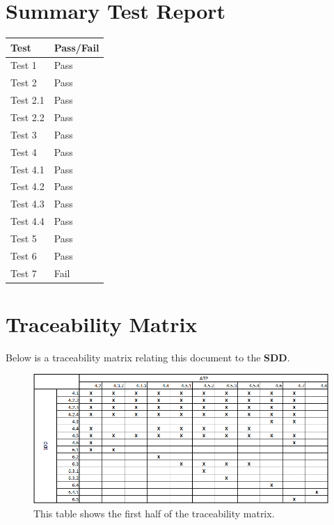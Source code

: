 \documentclass[11pt]{article}
\begin{document}
\section{Summary Test Report}
\begin{table}[h]
\begin{tabular}{ll}
\textbf{Test}     & \textbf{Pass/Fail} \\ \hline
\multicolumn{1}{|L{10cm}|}{Test 1} & \multicolumn{1}{L{2cm}|}{Pass} \\ \hline
\multicolumn{1}{|L{10cm}|}{Test 2} & \multicolumn{1}{L{2cm}|}{Pass} \\ \hline
\multicolumn{1}{|L{10cm}|}{Test 2.1} & \multicolumn{1}{L{2cm}|}{Pass} \\ \hline
\multicolumn{1}{|L{10cm}|}{Test 2.2} & \multicolumn{1}{L{2cm}|}{Pass} \\ \hline
\multicolumn{1}{|L{10cm}|}{Test 3} & \multicolumn{1}{L{2cm}|}{Pass} \\ \hline
\multicolumn{1}{|L{10cm}|}{Test 4} & \multicolumn{1}{L{2cm}|}{Pass} \\ \hline
\multicolumn{1}{|L{10cm}|}{Test 4.1} & \multicolumn{1}{L{2cm}|}{Pass} \\ \hline
\multicolumn{1}{|L{10cm}|}{Test 4.2} & \multicolumn{1}{L{2cm}|}{Pass} \\ \hline
\multicolumn{1}{|L{10cm}|}{Test 4.3} & \multicolumn{1}{L{2cm}|}{Pass} \\ \hline
\multicolumn{1}{|L{10cm}|}{Test 4.4} & \multicolumn{1}{L{2cm}|}{Pass} \\ \hline
\multicolumn{1}{|L{10cm}|}{Test 5} & \multicolumn{1}{L{2cm}|}{Pass} \\ \hline
\multicolumn{1}{|L{10cm}|}{Test 6} & \multicolumn{1}{L{2cm}|}{Pass} \\ \hline
\multicolumn{1}{|L{10cm}|}{Test 7} & \multicolumn{1}{L{2cm}|}{Fail} \\ \hline
\end{tabular}
\end{table}

\section{Traceability Matrix}

Below is a traceability matrix relating this document to the \textbf{SDD}.

\begin{figure}[H]
\centering
\includegraphics[width=6in]{./images/traceability.png}
\caption[Traceability Matrix Part 1]{This table shows the first half of the traceability matrix.}
\label{tbl-trace-1}
\end{figure}
\end{document}
